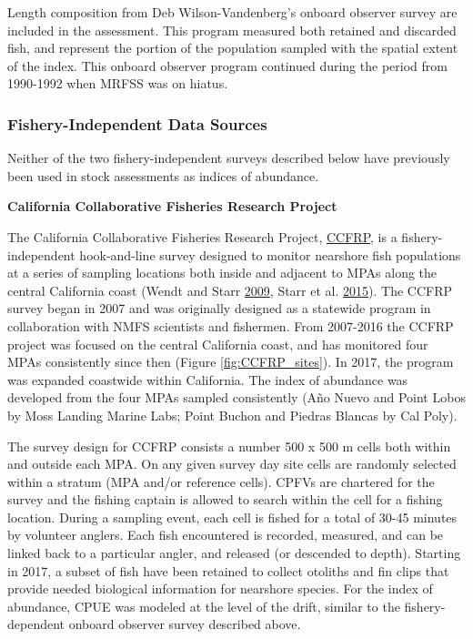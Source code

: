 \documentclass[12pt,]{article}
\begin{document}
Length composition from Deb Wilson-Vandenberg's onboard observer survey
are included in the assessment. This program measured both retained and
discarded fish, and represent the portion of the population sampled with
the spatial extent of the index. This onboard observer program continued
during the period from 1990-1992 when MRFSS was on hiatus.

\subsubsection{Fishery-Independent Data
Sources}\label{fishery-independent-data-sources}

Neither of the two fishery-independent surveys described below have
previously been used in stock assessments as indices of abundance.

\textbf{California Collaborative Fisheries Research Project}

The California Collaborative Fisheries Research Project,
\href{https://www.mlml.calstate.edu/ccfrp/}{CCFRP}, is a
fishery-independent hook-and-line survey designed to monitor nearshore
fish populations at a series of sampling locations both inside and
adjacent to MPAs along the central California coast (Wendt and Starr
\protect\hyperlink{ref-Wendt2009}{2009}, Starr et al.
\protect\hyperlink{ref-Starr2015}{2015}). The CCFRP survey began in 2007
and was originally designed as a statewide program in collaboration with
NMFS scientists and fishermen. From 2007-2016 the CCFRP project was
focused on the central California coast, and has monitored four MPAs
consistently since then (Figure \ref{fig:CCFRP_sites}). In 2017, the
program was expanded coastwide within California. The index of abundance
was developed from the four MPAs sampled consistently (Año Nuevo and
Point Lobos by Moss Landing Marine Labs; Point Buchon and Piedras
Blancas by Cal Poly).

The survey design for CCFRP consists a number 500 x 500 m cells both
within and outside each MPA. On any given survey day site cells are
randomly selected within a stratum (MPA and/or reference cells). CPFVs
are chartered for the survey and the fishing captain is allowed to
search within the cell for a fishing location. During a sampling event,
each cell is fished for a total of 30-45 minutes by volunteer anglers.
Each fish encountered is recorded, measured, and can be linked back to a
particular angler, and released (or descended to depth). Starting in
2017, a subset of fish have been retained to collect otoliths and fin
clips that provide needed biological information for nearshore species.
For the index of abundance, CPUE was modeled at the level of the drift,
similar to the fishery-dependent onboard observer survey described
above.
\end{document}

